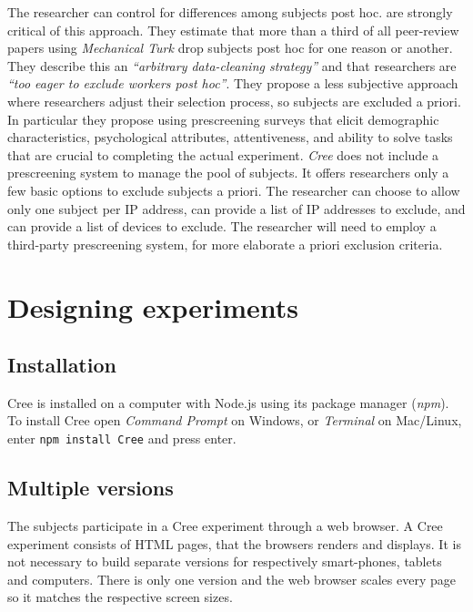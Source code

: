 \documentclass[preprint, 12pt]{elsarticle}
\newcommand{\Cree}{\emph{Cree}\xspace}
\begin{document}
The researcher can control for differences among subjects post hoc. \citet[p. 121]{Chandler_Mueller_Paolacci_2014} are strongly critical of this approach. They estimate that more than a third of all peer-review papers using \emph{Mechanical Turk} drop subjects post hoc for one reason or another. They describe this an \emph{``arbitrary data-cleaning strategy''} and that researchers are \emph{``too eager to exclude workers post hoc''}. They propose a less subjective approach where researchers adjust their selection process, so subjects are excluded a priori. In particular they propose using prescreening surveys that elicit demographic characteristics, psychological attributes, attentiveness, and ability to solve tasks that are crucial to completing the actual experiment. \Cree does not include a prescreening system to manage the pool of subjects. It offers researchers only a few basic options to exclude subjects a priori. The researcher can choose to allow only one subject per IP address, can provide a list of IP addresses to exclude, and can provide a list of devices to exclude. The researcher will need to employ a third-party prescreening system, for more elaborate a priori exclusion criteria.


\section{Designing experiments}
\label{S:Designing}

\subsection{Installation}

Cree is installed on a computer with Node.js using its package manager (\emph{npm}). To install Cree open \emph{Command Prompt} on Windows, or \emph{Terminal} on Mac/Linux, enter \texttt{npm~install~Cree} and press enter.

\subsection{Multiple versions}

The subjects participate in a Cree experiment through a web browser. A Cree experiment consists of HTML pages, that the browsers renders and displays. It is not necessary to build separate versions for respectively smart-phones, tablets and computers. There is only one version and the web browser scales every page so it matches the respective screen sizes. 
\end{document}
